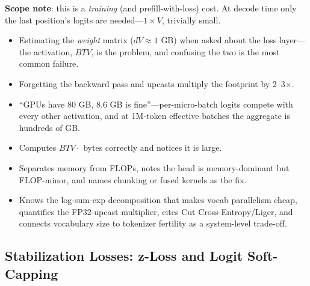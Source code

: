 \begin{interviewq}
\textbf{Scope note}: this is a \textit{training} (and prefill-with-loss) cost. At decode time only the last position's logits are needed---$1 \times V$, trivially small.

\redflags
\begin{itemize}
    \item Estimating the \textit{weight} matrix ($dV \approx 1$ GB) when asked about the loss layer---the activation, $BTV$, is the problem, and confusing the two is the most common failure.
    \item Forgetting the backward pass and upcasts multiply the footprint by 2--3$\times$.
    \item ``GPUs have 80 GB, 8.6 GB is fine''---per-micro-batch logits compete with every other activation, and at 1M-token effective batches the aggregate is hundreds of GB.
\end{itemize}


\goodgreat
\begin{itemize}
    \item {} Computes $BTV \cdot$ bytes correctly and notices it is large.
    \item {} Separates memory from FLOPs, notes the head is memory-dominant but FLOP-minor, and names chunking or fused kernels as the fix.
    \item {} Knows the log-sum-exp decomposition that makes vocab parallelism cheap, quantifies the FP32-upcast multiplier, cites Cut Cross-Entropy/Liger, and connects vocabulary size to tokenizer fertility as a system-level trade-off.
\end{itemize}

\end{interviewq}

\subsection{Stabilization Losses: z-Loss and Logit Soft-Capping}

